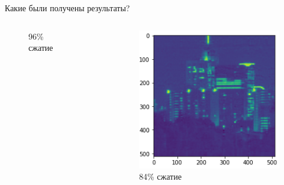 \documentclass{beamer}
\begin{document}
\begin{frame}{Какие были получены результаты?}
\begin{columns}
\begin{column}{0.245\textwidth}
\begin{figure}
                    \caption{96\% сжатие}\label{fig:awesome_image1}
            \end{figure}
        \end{column}
        \begin{column}{0.245\textwidth}
        \end{column}
        \begin{column}{0.245\textwidth}
            \begin{figure}
                \centering
                    \includegraphics[width=\linewidth]{16.PNG}
                    \caption{84\% сжатие}\label{fig:awesome_image1}
            \end{figure}
        \end{column}
    \end{columns}

\end{frame}
\end{document}
